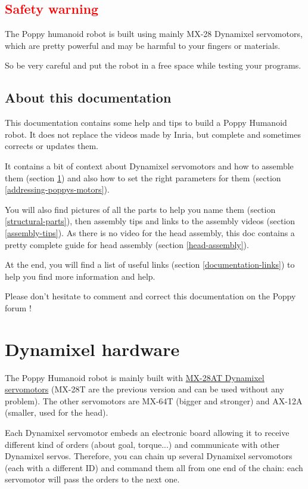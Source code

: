 \documentclass[includefoot]{article}
\begin{document}
\subsection{\textcolor{red}{Safety warning}}

The Poppy humanoid robot is built using mainly MX-28 Dynamixel servomotors, which are pretty powerful and may be harmful to your fingers or materials.

So be very careful and put the robot in a free space while testing your programs.

\subsection{About this documentation}

This documentation contains some help and tips to build a Poppy Humanoid robot. It does not replace the videos made by Inria, but complete and sometimes corrects or updates them.

It contains a bit of context about Dynamixel servomotors and how to assemble them (section \ref{dynamixel-hardware}) and also how to set the right parameters for them (section \ref{addressing-poppys-motors}).

You will also find pictures of all the parts to help you name them (section \ref{structural-parts}), then assembly tips and links to the assembly videos (section \ref{assembly-tips}). As there is no video for the head assembly, this doc contains a pretty complete guide for head assembly (section \ref{head-assembly}).

At the end, you will find a list of useful links (section \ref{documentation-links}) to help you find more information and help.

Please don't hesitate to comment and correct this documentation on the Poppy forum !

\section{Dynamixel hardware}
\label{dynamixel-hardware}

The Poppy Humanoid robot is mainly built with \href{http://www.generationrobots.com/en/401858-servomotor-dynamixel-mx-28at.html}{MX-28AT Dynamixel servomotors} (MX-28T are the previous version and can be used without any problem). The other servomotors are MX-64T (bigger and stronger) and AX-12A (smaller, used for the head).

Each Dynamixel servomotor embeds an electronic board allowing it to receive different kind of orders (about goal, torque...) and communicate with other Dynamixel servos. Therefore, you can chain up several Dynamixel servomotors (each with a different ID) and command them all from one end of the chain: each servomotor will pass the orders to the next one. 
\end{document}
